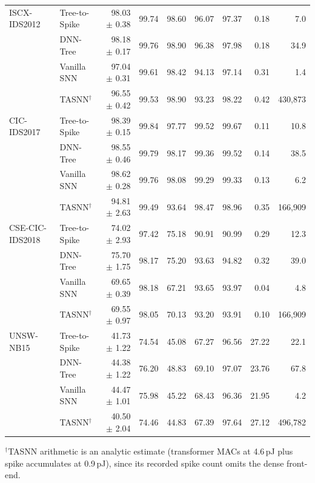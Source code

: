 \begin{table}[!t]
\begin{tabular}{llrrrrrrr}
\midrule
ISCX-IDS2012 & Tree-to-Spike & 98.03 $\pm$ 0.38 & 99.74 & 98.60 & 96.07 & 97.37 & 0.18 & 7.0 \\
 & DNN-Tree & 98.18 $\pm$ 0.17 & 99.76 & 98.90 & 96.38 & 97.98 & 0.18 & 34.9 \\
 & Vanilla SNN & 97.04 $\pm$ 0.31 & 99.61 & 98.42 & 94.13 & 97.14 & 0.31 & 1.4 \\
 & TASNN$^\dagger$ & 96.55 $\pm$ 0.42 & 99.53 & 98.90 & 93.23 & 98.22 & 0.42 & 430{,}873 \\
\midrule
CIC-IDS2017 & Tree-to-Spike & 98.39 $\pm$ 0.15 & 99.84 & 97.77 & 99.52 & 99.67 & 0.11 & 10.8 \\
 & DNN-Tree & 98.55 $\pm$ 0.46 & 99.79 & 98.17 & 99.36 & 99.52 & 0.14 & 38.5 \\
 & Vanilla SNN & 98.62 $\pm$ 0.28 & 99.76 & 98.08 & 99.29 & 99.33 & 0.13 & 6.2 \\
 & TASNN$^\dagger$ & 94.81 $\pm$ 2.63 & 99.49 & 93.64 & 98.47 & 98.96 & 0.35 & 166{,}909 \\
\midrule
CSE-CIC-IDS2018 & Tree-to-Spike & 74.02 $\pm$ 2.93 & 97.42 & 75.18 & 90.91 & 90.99 & 0.29 & 12.3 \\
 & DNN-Tree & 75.70 $\pm$ 1.75 & 98.17 & 75.20 & 93.63 & 94.82 & 0.32 & 39.0 \\
 & Vanilla SNN & 69.65 $\pm$ 0.39 & 98.18 & 67.21 & 93.65 & 93.97 & 0.04 & 4.8 \\
 & TASNN$^\dagger$ & 69.55 $\pm$ 0.97 & 98.05 & 70.13 & 93.20 & 93.91 & 0.10 & 166{,}909 \\
\midrule
UNSW-NB15 & Tree-to-Spike & 41.73 $\pm$ 1.22 & 74.54 & 45.08 & 67.27 & 96.56 & 27.22 & 22.1 \\
 & DNN-Tree & 44.38 $\pm$ 1.22 & 76.20 & 48.83 & 69.10 & 97.07 & 23.76 & 67.8 \\
 & Vanilla SNN & 44.47 $\pm$ 1.01 & 75.98 & 45.22 & 68.43 & 96.36 & 21.95 & 4.2 \\
 & TASNN$^\dagger$ & 40.50 $\pm$ 2.04 & 74.46 & 44.83 & 67.39 & 97.64 & 27.12 & 496{,}782 \\
\bottomrule
\end{tabular}
\par\vspace{2pt}\parbox{\linewidth}{\scriptsize $^\dagger$TASNN arithmetic is an analytic estimate (transformer MACs at 4.6\,pJ plus spike accumulates at 0.9\,pJ), since its recorded spike count omits the dense front-end.}
\end{table}
